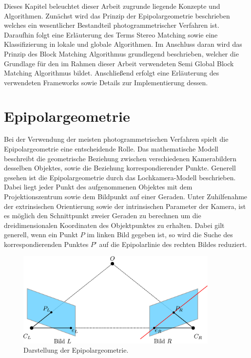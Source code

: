 Dieses Kapitel beleuchtet dieser Arbeit zugrunde liegende Konzepte und Algorithmen. Zunächst wird das Prinzip der Epipolargeometrie beschrieben welches ein wesentlicher Bestandteil photogrammetrischer Verfahren ist. Daraufhin folgt eine Erläuterung des Terms Stereo Matching sowie eine Klassifizierung in lokale und globale Algorithmen. Im Anschluss daran wird das Prinzip des Block Matching Algorithmus grundlegend beschrieben, welcher die Grundlage für den im Rahmen dieser Arbeit verwendeten Semi Global Block Matching Algorithmus bildet. Anschließend erfolgt eine Erläuterung des verwendeten Frameworks sowie Details zur Implementierung dessen.

\section{Epipolargeometrie}
\label{sec:epipolargeometrie}
Bei der Verwendung der meisten photogrammetrischen Verfahren spielt die Epipolargeometrie eine entscheidende Rolle. Das mathematische Modell beschreibt die geometrische Beziehung zwischen verschiedenen Kamerabildern desselben Objektes, sowie die Beziehung korrespondierender Punkte. Generell gesehen ist die Epipolargeometrie durch das Lochkamera-Modell beschrieben. Dabei liegt jeder Punkt des aufgenommenen Objektes mit dem Projektionszentrum sowie dem Bildpunkt auf einer Geraden. Unter Zuhilfenahme der extrinsischen Orientierung sowie der intrinsischen Parameter der Kamera, ist es möglich den Schnittpunkt zweier Geraden zu berechnen um die dreidimensionalen Koordinaten des Objektpunktes zu erhalten. Dabei gilt generell, wenn ein Punkt $P$ im linken Bild gegeben ist, so wird die Suche des korrespondierenden Punktes $P’$ auf die Epipolarlinie des rechten Bildes reduziert. 

\begin{figure}
	\begin{center}
		\includegraphics[width=10cm]{img/epipolar_geometry.pdf}
	\end{center}
	\caption{Darstellung der Epipolargeometrie.}
	\label{fig:epipolar_geometry}
\end{figure}


